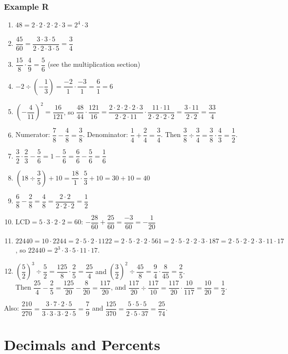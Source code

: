 \documentclass[letter]{article}
\newcommand{\chp}{}
\newcommand{\solsec}[1]{\phantomsection\label{sec:\chp ex#1}\subsubsection*{Example #1}}
\begin{document}
\solsec{R}
\begin{enumerate}[label=\arabic*.]
  \item $48=2\cdot2\cdot2\cdot2\cdot3=2^4\cdot3$
  \item $\dfrac{45}{60}=\dfrac{3\cdot3\cdot5}{2\cdot2\cdot3\cdot5}=\dfrac34$
  \item $\dfrac{15}8\cdot\dfrac49=\dfrac56$ (see the multiplication section)
  \item $-2\div\left(-\dfrac13\right)=\dfrac{-2}1\cdot\dfrac{-3}1=\dfrac61=6$
  \item $\left(-\dfrac4{11}\right)^2=\dfrac{16}{121}$, so $\dfrac{48}{44}\cdot\dfrac{121}{16}=\dfrac{2\cdot2\cdot2\cdot2\cdot3}{2\cdot2\cdot11}\cdot\dfrac{11\cdot11}{2\cdot2\cdot2\cdot2}=\dfrac{3\cdot11}{2\cdot2}=\dfrac{33}4$
  \item Numerator: $\dfrac78-\dfrac48=\dfrac38$. Denominator: $\dfrac14+\dfrac24=\dfrac34$. Then $\dfrac38\div\dfrac34=\dfrac38\cdot\dfrac43=\dfrac12$.
  \item $\dfrac32\cdot\dfrac23-\dfrac56=1-\dfrac56=\dfrac66-\dfrac56=\dfrac16$
  \item $\left(18\div\dfrac35\right)+10=\dfrac{18}1\cdot\dfrac53+10=30+10=40$
  \item $\dfrac68-\dfrac28=\dfrac48=\dfrac{2\cdot2}{2\cdot2\cdot2}=\dfrac12$
  \item $\text{LCD}=5\cdot3\cdot2\cdot2=60$: $-\dfrac{28}{60}+\dfrac{25}{60}=\dfrac{-3}{60}=-\dfrac1{20}$
  \item $22440=10\cdot2244=2\cdot5\cdot2\cdot1122=2\cdot5\cdot2\cdot2\cdot561=2\cdot5\cdot2\cdot2\cdot3\cdot187=2\cdot5\cdot2\cdot2\cdot3\cdot11\cdot17$, so $22440=2^3\cdot3\cdot5\cdot11\cdot17$.
  \item $\left(\dfrac52\right)^3\div\dfrac52=\dfrac{125}8\cdot\dfrac25=\dfrac{25}4$ and $\left(\dfrac32\right)^2\div\dfrac{45}8=\dfrac94\cdot\dfrac8{45}=\dfrac25$.\\
  Then $\dfrac{25}4-\dfrac25=\dfrac{125}{20}-\dfrac8{20}=\dfrac{117}{20}$, and $\dfrac{117}{20}\div\dfrac{117}{10}=\dfrac{117}{20}\cdot\dfrac{10}{117}=\dfrac{10}{20}=\dfrac12$.
\end{enumerate}
Also: $\dfrac{210}{270}=\dfrac{3\cdot7\cdot2\cdot5}{3\cdot3\cdot3\cdot2\cdot5}=\dfrac79$ and $\dfrac{125}{370}=\dfrac{5\cdot5\cdot5}{2\cdot5\cdot37}=\dfrac{25}{74}$.
\clearpage
\def\chp{dec}
\lfoot{}
\section{Decimals and Percents}
\end{document}
